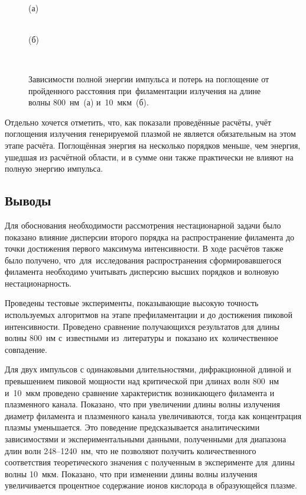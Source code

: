 \begin{figure}[H]
    \begin{center}
        \begin{minipage}{\minipagewidthtwo}
             \\
            \footnotesize{(а)}
        \end{minipage}
        \begin{minipage}{\minipagewidthtwo}
             \\
            \footnotesize{(б)}
        \end{minipage}
        \\[1ex]
        \caption{Зависимости полной энергии импульса и потерь на поглощение от пройденного расстояния при~филаментации излучения на длине волны 800~нм~(а) и~10~мкм~(б).}
        \label{fig:PulsesEnergy}
    \end{center}
\end{figure}


Отдельно хочется отметить, что, как показали проведённые расчёты, учёт поглощения излучения генерируемой плазмой не является обязательным на этом этапе расчёта.
Поглощённая энергия на несколько порядков меньше, чем энергия, ушедшая из расчётной области, и в сумме они также практически не влияют на полную энергию импульса.


\subsection{Выводы}

Для обоснования необходимости рассмотрения нестационарной задачи было показано влияние
дисперсии второго порядка на распространение филамента до точки достижения первого максимума интенсивности.
В ходе расчётов также было получено, что~для~исследования распространения сформировавшегося филамента
необходимо учитывать дисперсию высших порядков и волновую нестационарность.

Проведены тестовые эксперименты, показывающие высокую точность используемых алгоритмов на этапе префиламентации и до достижения пиковой интенсивности.
Проведено сравнение получающихся результатов для длины волны 800~нм с~известными из~литературы и~показано их~количественное совпадение.

Для двух импульсов с одинаковыми длительностями, дифракционной длиной и превышением пиковой мощности над критической
при длинах волн 800~нм и~10~мкм проведено сравнение характеристик возникающего филамента и плазменного канала.
Показано, что при увеличении длины волны излучения диаметр филамента и плазменного канала увеличиваются,
тогда как концентрация плазмы уменьшается.
Это поведение предсказывается аналитическими зависимостями и экспериментальными данными,
полученными для диапазона длин волн 248--1240~нм,
что не позволяют получить количественного соответствия теоретического значения
с полученным в эксперименте для~длины волны 10~мкм.
Показано, что при изменении длины волны излучения увеличивается процентное содержание ионов кислорода в образующейся плазме.

